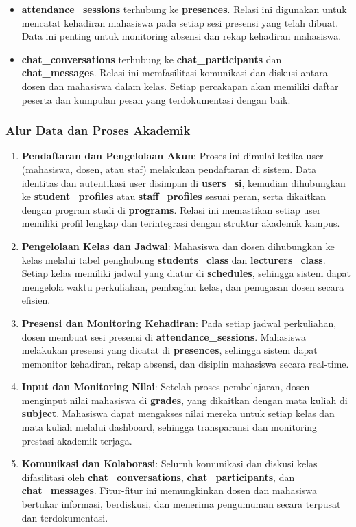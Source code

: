 \documentclass[a4paper,oneside,11pt]{book}
\begin{document}
\begin{itemize}
  \item \textbf{attendance\_sessions} terhubung ke \textbf{presences}. Relasi ini digunakan untuk mencatat kehadiran mahasiswa pada setiap sesi presensi yang telah dibuat. Data ini penting untuk monitoring absensi dan rekap kehadiran mahasiswa.
  \item \textbf{chat\_conversations} terhubung ke \textbf{chat\_participants} dan \textbf{chat\_messages}. Relasi ini memfasilitasi komunikasi dan diskusi antara dosen dan mahasiswa dalam kelas. Setiap percakapan akan memiliki daftar peserta dan kumpulan pesan yang terdokumentasi dengan baik.
\end{itemize}

\subsubsection{Alur Data dan Proses Akademik}
\begin{enumerate}
  \item \textbf{Pendaftaran dan Pengelolaan Akun}: Proses ini dimulai ketika user (mahasiswa, dosen, atau staf) melakukan pendaftaran di sistem. Data identitas dan autentikasi user disimpan di \textbf{users\_si}, kemudian dihubungkan ke \textbf{student\_profiles} atau \textbf{staff\_profiles} sesuai peran, serta dikaitkan dengan program studi di \textbf{programs}. Relasi ini memastikan setiap user memiliki profil lengkap dan terintegrasi dengan struktur akademik kampus.
  \item \textbf{Pengelolaan Kelas dan Jadwal}: Mahasiswa dan dosen dihubungkan ke kelas melalui tabel penghubung \textbf{students\_class} dan \textbf{lecturers\_class}. Setiap kelas memiliki jadwal yang diatur di \textbf{schedules}, sehingga sistem dapat mengelola waktu perkuliahan, pembagian kelas, dan penugasan dosen secara efisien.
  \item \textbf{Presensi dan Monitoring Kehadiran}: Pada setiap jadwal perkuliahan, dosen membuat sesi presensi di \textbf{attendance\_sessions}. Mahasiswa melakukan presensi yang dicatat di \textbf{presences}, sehingga sistem dapat memonitor kehadiran, rekap absensi, dan disiplin mahasiswa secara real-time.
  \item \textbf{Input dan Monitoring Nilai}: Setelah proses pembelajaran, dosen menginput nilai mahasiswa di \textbf{grades}, yang dikaitkan dengan mata kuliah di \textbf{subject}. Mahasiswa dapat mengakses nilai mereka untuk setiap kelas dan mata kuliah melalui dashboard, sehingga transparansi dan monitoring prestasi akademik terjaga.
  \item \textbf{Komunikasi dan Kolaborasi}: Seluruh komunikasi dan diskusi kelas difasilitasi oleh \textbf{chat\_conversations}, \textbf{chat\_participants}, dan \textbf{chat\_messages}. Fitur-fitur ini memungkinkan dosen dan mahasiswa bertukar informasi, berdiskusi, dan menerima pengumuman secara terpusat dan terdokumentasi.
\end{enumerate}
\end{document}
